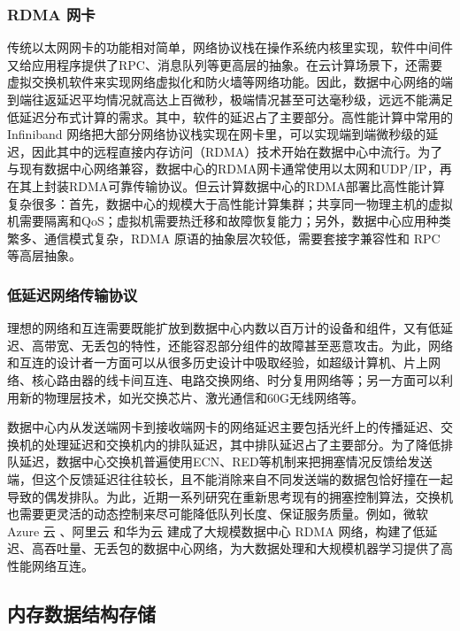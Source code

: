 \subsubsection{RDMA 网卡}

传统以太网网卡的功能相对简单，网络协议栈在操作系统内核里实现，软件中间件又给应用程序提供了RPC、消息队列等更高层的抽象。在云计算场景下，还需要虚拟交换机软件来实现网络虚拟化和防火墙等网络功能。因此，数据中心网络的端到端往返延迟平均情况就高达上百微秒，极端情况甚至可达毫秒级，远远不能满足低延迟分布式计算的需求。其中，软件的延迟占了主要部分。高性能计算中常用的 Infiniband \cite{infiniband2000infiniband} 网络把大部分网络协议栈实现在网卡里，可以实现端到端微秒级的延迟，因此其中的远程直接内存访问（RDMA）技术开始在数据中心中流行。为了与现有数据中心网络兼容，数据中心的RDMA网卡通常使用以太网和UDP/IP，再在其上封装RDMA可靠传输协议。但云计算数据中心的RDMA部署比高性能计算复杂很多：首先，数据中心的规模大于高性能计算集群；共享同一物理主机的虚拟机需要隔离和QoS；虚拟机需要热迁移和故障恢复能力；另外，数据中心应用种类繁多、通信模式复杂，RDMA 原语的抽象层次较低，需要套接字兼容性和 RPC 等高层抽象。

\subsubsection{低延迟网络传输协议}

理想的网络和互连需要既能扩放到数据中心内数以百万计的设备和组件，又有低延迟、高带宽、无丢包的特性，还能容忍部分组件的故障甚至恶意攻击。为此，网络和互连的设计者一方面可以从很多历史设计中吸取经验，如超级计算机、片上网络、核心路由器的线卡间互连、电路交换网络、时分复用网络等；另一方面可以利用新的物理层技术，如光交换芯片、激光通信和60G无线网络等。

数据中心内从发送端网卡到接收端网卡的网络延迟主要包括光纤上的传播延迟、交换机的处理延迟和交换机内的排队延迟，其中排队延迟占了主要部分。为了降低排队延迟，数据中心交换机普遍使用ECN、RED等机制来把拥塞情况反馈给发送端，但这个反馈延迟往往较长，且不能消除来自不同发送端的数据包恰好撞在一起导致的偶发排队。为此，近期一系列研究在重新思考现有的拥塞控制算法，交换机也需要更灵活的动态控制来尽可能降低队列长度、保证服务质量。例如，微软 Azure 云 \cite{guo2016rdma}、阿里云 \cite{aliyun-rdma} 和华为云 \cite{huawei-lossless} 建成了大规模数据中心 RDMA 网络，构建了低延迟、高吞吐量、无丢包的数据中心网络，为大数据处理和大规模机器学习提供了高性能网络互连。


\subsection{内存数据结构存储}

